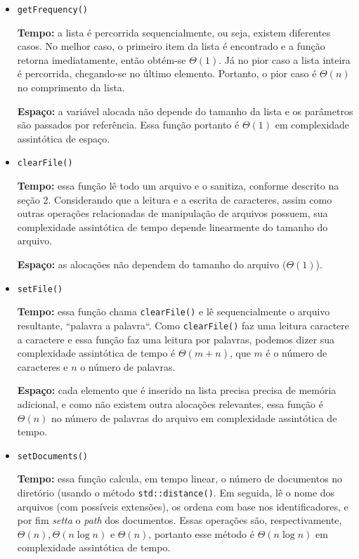 \documentclass{article}
\def\code#1{\texttt{#1}}
\begin{document}
\begin{itemize}

	\item \code{getFrequency()}

	      \textbf{Tempo:} a lista é percorrida sequencialmente, ou seja, existem diferentes casos. No melhor caso, o primeiro item da lista é encontrado e a função retorna imediatamente, então obtém-se \( \Theta(1) \). Já no pior caso a lista inteira é percorrida, chegando-se no último elemento. Portanto, o pior caso é \( \Theta(n) \) no comprimento da lista.

	      \textbf{Espaço:} a variável alocada não depende do tamanho da lista e os parâmetros são passados por referência. Essa função portanto é \( \Theta(1) \) em complexidade assintótica de espaço.

	\item \code{clearFile()}

	      \textbf{Tempo:} essa função lê todo um arquivo e o sanitiza, conforme descrito na seção 2. Considerando que a leitura e a escrita de caracteres, assim como outras operações relacionadas de manipulação de arquivos possuem, sua complexidade assintótica de tempo depende linearmente do tamanho do arquivo.

	      \textbf{Espaço:} as alocações não dependem do tamanho do arquivo (\( \Theta(1) \)).

	\item \code{setFile()}

	      \textbf{Tempo:} essa função chama \code{clearFile()} e lê sequencialmente o arquivo resultante, ``palavra a palavra``. Como \code{clearFile()} faz uma leitura caractere a caractere e essa função faz uma leitura por palavras, podemos dizer sua complexidade assintótica de tempo é \( \Theta(m + n) \), que \( m \) é o número de caracteres e \( n \) o número de palavras.

	      \textbf{Espaço:} cada elemento que é inserido na lista precisa precisa de memória adicional, e como não existem outra alocações relevantes, essa função é \( \Theta(n) \) no número de palavras do arquivo em complexidade assintótica de tempo.

	\item \code{setDocuments()}

	      \textbf{Tempo:} essa função calcula, em tempo linear, o número de documentos no diretório (usando o método \code{std::distance()}. Em seguida, lê o nome dos arquivos (com possíveis extensões), os ordena com base nos identificadores, e por fim \textit{setta} o \textit{path} dos documentos. Essas operações são, respectivamente, \( \Theta(n), \Theta(n \log n) \) e \( \Theta(n) \), portanto esse método é \( \Theta(n \log n) \) em complexidade assintótica de tempo.


\end{itemize}
\end{document}
